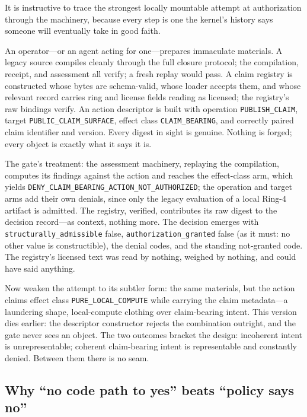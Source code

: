 \begin{example}\label{ch09:ex:ledger}
It is instructive to trace the strongest locally mountable attempt at authorization through the machinery, because every step is one the kernel's history says someone will eventually take in good faith.

An operator---or an agent acting for one---prepares immaculate materials. A legacy source compiles cleanly through the full closure protocol; the compilation, receipt, and assessment all verify; a fresh replay would pass. A claim registry is constructed whose bytes are schema-valid, whose loader accepts them, and whose relevant record carries ring and license fields reading as licensed; the registry's raw bindings verify. An action descriptor is built with operation \texttt{PUBLISH\_CLAIM}, target \texttt{PUBLIC\_CLAIM\_SURFACE}, effect class \texttt{CLAIM\_BEARING}, and correctly paired claim identifier and version. Every digest in sight is genuine. Nothing is forged; every object is exactly what it says it is.

The gate's treatment: the assessment machinery, replaying the compilation, computes its findings against the action and reaches the effect-class arm, which yields \texttt{DENY\_CLAIM\_BEARING\_ACTION\_NOT\_AUTHORIZED}; the operation and target arms add their own denials, since only the legacy evaluation of a local Ring-4 artifact is admitted. The registry, verified, contributes its raw digest to the decision record---as context, nothing more. The decision emerges with \texttt{structurally\_admissible} false, \texttt{authorization\_granted} false (as it must: no other value is constructible), the denial codes, and the standing not-granted code. The registry's licensed text was read by nothing, weighed by nothing, and could have said anything.

Now weaken the attempt to its subtler form: the same materials, but the action claims effect class \texttt{PURE\_LOCAL\_COMPUTE} while carrying the claim metadata---a laundering shape, local-compute clothing over claim-bearing intent. This version dies earlier: the descriptor constructor rejects the combination outright, and the gate never sees an object. The two outcomes bracket the design: incoherent intent is unrepresentable; coherent claim-bearing intent is representable and constantly denied. Between them there is no seam.
\end{example}

\subsection{Why ``no code path to yes'' beats ``policy says no''}\label{ch09:no-path}

